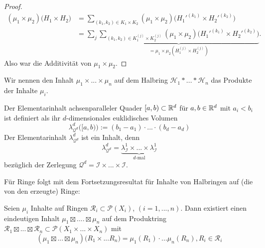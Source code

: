 \begin{satz}
\begin{proof}
\begin{equation*}
	\begin{split}
	(\mu_1 \times \mu_2) \big( H_1 \times H_2 \big) & = \sum_{(k_1,k_2) \in K_1 \times K_2} (\mu_1 \times \mu_2) \big(H_1'^{(k_1)} \times H_2'^{(k_2)} \big) \\
	& = \sum_j \underbrace{ \sum_{(k_1,k_2) \in K_1^{(j)} \times K_2^{(j)}} (\mu_1 \times \mu_2) \big(H_1'^{(k_1)} \times H_2'^{(k_2)} \big)}_{= \mu_1 \times \mu_2 (H_1^{(j)} \times H_2 ^{(j)})}.
	\end{split}
\end{equation*}
Also war die Additivität von $\mu_1 \times \mu_2$.
\end{proof}
\end{satz}

\begin{definition}
\begin{mdframed}
Wir nennen den Inhalt $\mu_1 \times ... \times \mu_n$ auf dem Halbring $\mathcal{H}_1 \ast ... \ast \mathcal{H}_n$ das Produkte der Inhalte $\mu_i$.
\end{mdframed}
\end{definition}

\begin{hauptbsp}
Der Elementarinhalt achsenparalleler Quader $[a,b) \subset \mathbb{R}^d$ für $a,b \in \mathbb{R}^d$ mit $a_i < b_i$ ist definiert als ihr $d$-dimensionales euklidisches Volumen
$$
\lambda^d_{\mathcal{Q}^d}\big([a,b)\big) := (b_1 -a_1) \cdot ... \cdot (b_d-a_d)
$$
Der Elementarinhalt $\lambda^d_{\mathcal{Q}^d}$ ist ein Inhalt, denn
$$
\lambda^d_{\mathcal{Q}^d} = \underbrace{\lambda^1_\mathcal{I} \times ... \times \lambda^1_\mathcal{I}}_{d\text{-mal}}
$$
bezüglich der Zerlegung $\mathcal{Q}^d = \mathcal{I} \times ... \times \mathcal{I}$.
\end{hauptbsp}

Für Ringe folgt mit dem Fortsetzungsresultat für Inhalte von Halbringen auf (die von den erzeugte) Ringe:

\begin{korollar}
Seien $\mu_i$ Inhalte auf Ringen $\mathcal{R}_i \subset \mathcal{P}(X_i)$, $(i=1,...,n)$. Dann existiert einen eindeutigen Inhalt $\mu_1 \boxtimes .... \boxtimes \mu_n$ auf dem Produktring $\mathcal{R}_1 \boxtimes ... \boxtimes \mathcal{R}_n \subset \mathcal{P}(X_1 \times ... \times X_n)$ mit
$$(\mu_1 \boxtimes ... \boxtimes \mu_n) \big( R_1 \times ... R_n\big) = \mu_1 (R_1) \cdot ... \mu_n(R_n), R_i \in \mathcal{R}_i$$
\end{korollar}

